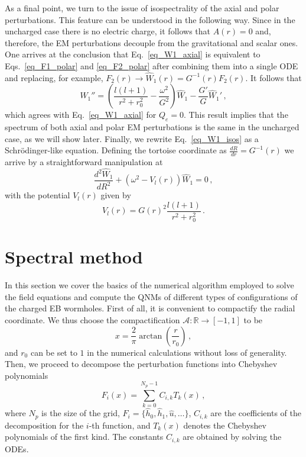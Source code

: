 \documentclass[11pt,a4paper]{article}
\begin{document}
As a final point, we turn to the issue of isospectrality of the axial and polar perturbations.
This feature can be understood in the following way. 
Since in the uncharged case there is no electric charge, it follows that $A(r)=0$ and, therefore, the EM perturbations decouple from the gravitational and scalar ones. 
One arrives at the conclusion that Eq.~\eqref{eq_W1_axial} is equivalent to Eqs.~\eqref{eq_F1_polar} and \eqref{eq_F2_polar} after combining them into a single ODE and replacing, for example, $F_2(r)\to \hat{W}_1(r)=G^{-1}(r)F_2(r)$. 
It follows that
%
\begin{equation}\label{eq_W1_isos}
    \hat{W}_1''=\left(\frac{l(l+1)}{r^2+r_0^2}-\frac{\omega^2}{G^2}\right)\hat{W}_1-\frac{G'}{G}\hat{W}_1' \,,
\end{equation}
%
which agrees with Eq.~\eqref{eq_W1_axial} for $Q_e=0$. 
This result implies that the spectrum of both axial and polar EM perturbations is the same in the uncharged case, as we will show later. 
Finally, we rewrite Eq.~\eqref{eq_W1_isos} as a Schrödinger-like equation. 
Defining the tortoise coordinate as 
$\frac{dR}{dr}=G^{-1}(r)$ 
we arrive by 
a straightforward manipulation at
%
\begin{equation}\label{eq_Schrodinger}
\frac{d^2\hat{W}_1}{d{R}^{2}}+\left(\omega^2-V_l(r)\right)\hat{W}_1=0 \,,
\end{equation}
%
with the potential $V_l(r)$ given by
%
\begin{equation}
    V_l(r)=G(r)^2\frac{l(l+1)}{r^2+r_0^2} \,.
\end{equation}



\section{Spectral method}
\label{sec:Spectral method}


In this section we cover the basics of the numerical algorithm employed to solve the field equations and compute the QNMs of different types of configurations of the charged EB wormholes. 
First of all, it is convenient to compactify the radial coordinate. We thus choose the compactification $\mathcal{A}:\mathbb{R}\to\left[-1,1\right]$ to be
%
\begin{equation}\label{compactification}
    x=\frac{2}{\pi}\arctan{\left(\frac{r}{r_0}\right)} \,,
\end{equation}
%
and $r_0$ can be set to $1$ in the numerical calculations without loss of generality.
Then, we proceed to decompose the perturbation functions into Chebyshev polynomials
%
\begin{equation}\label{spectral_decomp}
    F_i(x)=\sum_{k=0}^{N_p-1}C_{i,k}T_k(x) \,,
\end{equation}
%
where $N_p$ is the size of the grid, 
$F_i=\{\hat h_0,\hat h_1,\hat u,\dots\}$,
$C_{i,k}$ are the coefficients of the decomposition for the $i$-th function, and $T_k(x)$ denotes the Chebyshev polynomials of the first kind. 
The constants $C_{i,k}$ are obtained by solving the ODEs. 
\end{document}
